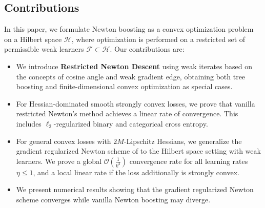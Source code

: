 \documentclass{article}
\theoremstyle{plain}
\theoremstyle{definition}
\theoremstyle{remark}
\begin{document}




\subsection{Contributions}
In this paper, we formulate Newton boosting as a convex optimization problem on a Hilbert space $\mathcal{H}$, where optimization is performed on a restricted set of permissible weak learners $\mathcal{F} \subset \mathcal{H}$. Our contributions are:

\begin{itemize}
    \item We introduce \textbf{Restricted Newton Descent} using weak iterates based on the concepts of cosine angle and weak gradient edge, obtaining both tree boosting and finite-dimensional convex optimization as special cases.

    \item For Hessian-dominated smooth strongly convex losses, we prove that vanilla restricted Newton's method achieves a linear rate of convergence. This includes $\ell_2$-regularized binary and categorical cross entropy.

    \item For general convex losses with $2M$-Lipschitz Hessians, we generalize the gradient regularized Newton scheme of \citet{2023RegularizedNewtonMethodWithGlobalConvergence} to the Hilbert space setting with weak learners. We prove a global $\mathcal{O}(\frac{1}{k^2})$ convergence rate for all learning rates $\eta \leq 1$, and a local linear rate if the loss additionally is strongly convex.
    
    \item We present numerical results showing that the gradient regularized Newton scheme converges while vanilla Newton boosting may diverge.    
\end{itemize}
\end{document}
